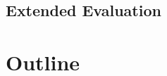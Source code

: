 
\subsection{Extended Evaluation}
\label{ch:intro-contributions-extendedEvaluation}



\section{Outline}
\label{ch:intro-outline}
